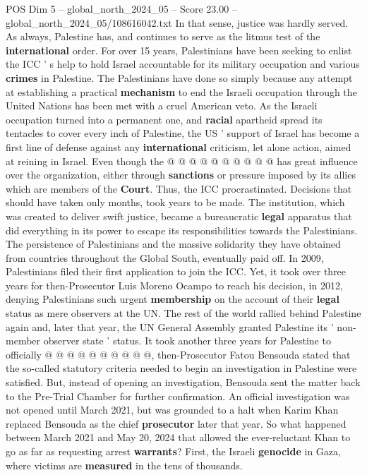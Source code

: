 \begin{textsample}{POS Dim 5 – global\_north\_2024\_05 – Score 23.00 – global\_north\_2024\_05/108616042.txt}
In that sense, justice was hardly served.
As always, Palestine has, and continues to serve as the litmus test of the \textbf{international} order.
For over 15 years, Palestinians have been seeking to enlist the ICC ' s help to hold Israel accountable for its military occupation and various \textbf{crimes} in Palestine.
The Palestinians have done so simply because any attempt at establishing a practical \textbf{mechanism} to end the Israeli occupation through the United Nations has been met with a cruel American veto.
As the Israeli occupation turned into a permanent one, and \textbf{racial} apartheid spread its tentacles to cover every inch of Palestine, the US ' support of Israel has become a first line of defense against any \textbf{international} criticism, let alone action, aimed at reining in Israel.
Even though the @ @ @ @ @ @ @ @ @ @ has great influence over the organization, either through \textbf{sanctions} or pressure imposed by its allies which are members of the \textbf{Court}.
Thus, the ICC procrastinated.
Decisions that should have taken only months, took years to be made.
The institution, which was created to deliver swift justice, became a bureaucratic \textbf{legal} apparatus that did everything in its power to escape its responsibilities towards the Palestinians.
The persistence of Palestinians and the massive solidarity they have obtained from countries throughout the Global South, eventually paid off.
In 2009, Palestinians filed their first application to join the ICC.
Yet, it took over three years for then-Prosecutor Luis Moreno Ocampo to reach his decision, in 2012, denying Palestinians such urgent \textbf{membership} on the account of their \textbf{legal} status as mere observers at the UN.
The rest of the world rallied behind Palestine again and, later that year, the UN General Assembly granted Palestine its ' non-member observer state ' status.
It took another three years for Palestine to officially @ @ @ @ @ @ @ @ @ @, then-Prosecutor Fatou Bensouda stated that the so-called statutory criteria needed to begin an investigation in Palestine were satisfied.
But, instead of opening an investigation, Bensouda sent the matter back to the Pre-Trial Chamber for further confirmation.
An official investigation was not opened until March 2021, but was grounded to a halt when Karim Khan replaced Bensouda as the chief \textbf{prosecutor} later that year.
So what happened between March 2021 and May 20, 2024 that allowed the ever-reluctant Khan to go as far as requesting arrest \textbf{warrants}?
First, the Israeli \textbf{genocide} in Gaza, where victims are \textbf{measured} in the tens of thousands.

\end{textsample}
